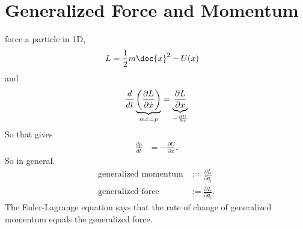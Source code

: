 \section{Generalized Force and Momentum}
force a particle in 1D,
\begin{align}
    L &= \frac{1}{2} m\doc{x}^2 - U(x)
\end{align}
and
\begin{align}
    \frac{d}{dt}\underbrace{%
        \left(
            \frac{\partial L}{\partial \dot{x}}
        \right)
    }_{m\dot{x} = p}
    =
    \underbrace{%
        \frac{\partial L}{\partial x}
    }_{%
        -\frac{\partial U}{\partial x}
    }
\end{align}
So that gives
\begin{align}
    \frac{dp}{dt} &= -\frac{\partial U}{\partial x}.
\end{align}
So in general.
\begin{align}
    \text{generalized momentum} &:= \frac{\partial L}{\partial \dot{q}_i}\\
    \text{generalized force} &:= \frac{\partial L}{\partial q_i}.
\end{align}
The Euler-Lagrange equation says that
the rate of change of generalized momentum equals the generalized force.

